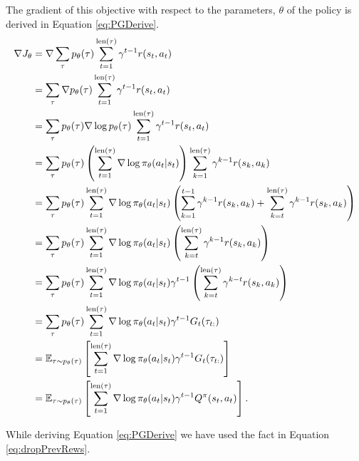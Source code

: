 \documentclass{report}
\numberwithin{equation}{section}
\numberwithin{figure}{section}
\numberwithin{table}{section}
\numberwithin{algorithm}{section}
\begin{document}
The gradient of this objective with respect to the parameters, $\theta$ 
of the policy is derived in Equation \ref{eq:PGDerive}.
\begin{align}\label{eq:PGDerive}
  \nabla J_\theta&=\nabla\sum_{\tau}p_{\theta}(\tau)\sum_{t=1}^{\text{len}(\tau)}\gamma^{t-1}r(s_t, a_t)\notag\\
  &=\sum_{\tau}\nabla p_{\theta}(\tau)\sum_{t=1}^{\text{len}(\tau)}\gamma^{t-1}r(s_t, a_t)\notag\\
  &=\sum_{\tau}p_{\theta}(\tau)\nabla \log p_\theta(\tau)\sum_{t=1}^{\text{len}(\tau)}\gamma^{t-1}r(s_t, a_t)\notag\\
  &=\sum_{\tau}p_{\theta}(\tau)\left(
    \sum_{t=1}^{\text{len}(\tau)}\nabla \log \pi_\theta(a_t|s_t)
  \right)\sum_{k=1}^{\text{len}(\tau)}\gamma^{k-1}r(s_k, a_k)\notag\\
  &=\sum_{\tau}p_\theta(\tau)\sum_{t=1}^{\text{len}(\tau)}\nabla \log \pi_\theta(a_t|s_t)
  \left(
    \sum_{k=1}^{t-1}\gamma^{k-1}r(s_k, a_k)
    + \sum_{k=t}^{\text{len}(\tau)}\gamma^{k-1}r(s_k, a_k)
  \right)\notag\\
  &=\sum_{\tau}p_\theta(\tau)\sum_{t=1}^{\text{len}(\tau)}\nabla \log \pi_\theta(a_t|s_t)
  \left(
    \sum_{k=t}^{\text{len}(\tau)}\gamma^{k-1}r(s_k, a_k)
  \right)\notag\\
  &=\sum_{\tau}p_\theta(\tau)\sum_{t=1}^{\text{len}(\tau)}\nabla \log \pi_\theta(a_t|s_t)
  \gamma^{t-1}\left(
    \sum_{k=t}^{\text{len}(\tau)}\gamma^{k-t}r(s_k, a_k)
  \right)\notag\\
  &=\sum_{\tau}p_\theta(\tau)\sum_{t=1}^{\text{len}(\tau)}\nabla \log \pi_\theta(a_t|s_t)
  \gamma^{t-1}G_t(\tau_{t:})\notag\\
  &=\mathbb{E}_{\tau\sim p_\theta(\tau)}\left[\sum_{t=1}^{\text{len}(\tau)}\nabla \log \pi_\theta(a_t|s_t)
  \gamma^{t-1}G_t(\tau_{t:})\right]\notag\\
  &=\mathbb{E}_{\tau\sim p_\theta(\tau)}\left[\sum_{t=1}^{\text{len}(\tau)}\nabla \log \pi_\theta(a_t|s_t)
  \gamma^{t-1}Q^{\pi}(s_t, a_t)\right].
\end{align}

While deriving Equation \ref{eq:PGDerive} we have used the 
fact in Equation \ref{eq:dropPrevRews}.
\end{document}

